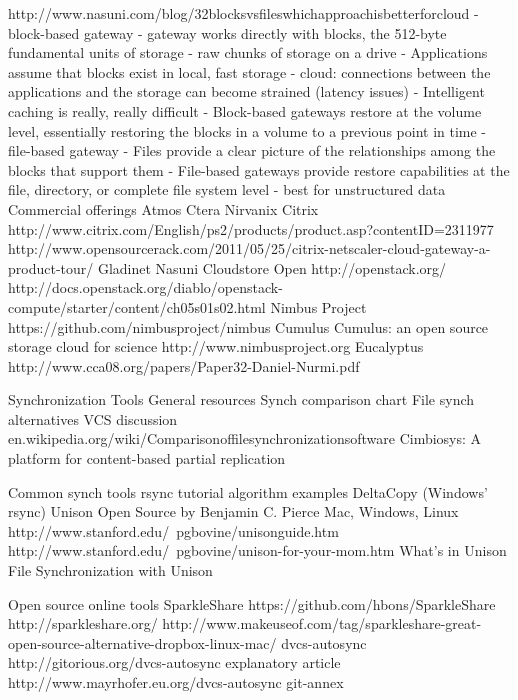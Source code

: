 			http://www.nasuni.com/blog/32blocksvsfileswhichapproachisbetterforcloud
				- block-based gateway
					- gateway works directly with blocks, the 512-byte fundamental units of storage
					- raw chunks of storage on a drive
					- Applications assume that blocks exist in local, fast storage
						- cloud: connections between the applications and the storage can become strained (latency issues)
					- Intelligent caching is really, really difficult 
					- Block-based gateways restore at the volume level, essentially restoring the blocks in a volume to a previous point in time
				- file-based gateway
					- Files provide a clear picture of the relationships among the blocks that support them
					- File-based gateways provide restore capabilities at the file, directory, or complete file system level
					- best for unstructured data
		Commercial offerings
			Atmos 
			Ctera
			Nirvanix 
			Citrix
			http://www.citrix.com/English/ps2/products/product.asp?contentID=2311977
			http://www.opensourcerack.com/2011/05/25/citrix-netscaler-cloud-gateway-a-product-tour/
			Gladinet 
			Nasuni
			Cloudstore 
		Open
			http://openstack.org/
				http://docs.openstack.org/diablo/openstack-compute/starter/content/ch05s01s02.html 
			Nimbus Project
				https://github.com/nimbusproject/nimbus
			Cumulus
				Cumulus: an open source storage cloud for science
				http://www.nimbusproject.org	
			Eucalyptus
				http://www.cca08.org/papers/Paper32-Daniel-Nurmi.pdf		

	Synchronization Tools
		General resources
			Synch comparison chart 
			File synch alternatives 
			VCS discussion
			en.wikipedia.org/wiki/Comparisonoffilesynchronizationsoftware
			Cimbiosys: A platform for content-based partial replication
		
		Common synch tools
			rsync
				tutorial
				algorithm 
				examples
			DeltaCopy (Windows' rsync)		
			Unison
				Open Source by Benjamin C. Pierce 
				Mac, Windows, Linux
				http://www.stanford.edu/~pgbovine/unisonguide.htm
				http://www.stanford.edu/~pgbovine/unison-for-your-mom.htm
				What's in Unison
				File Synchronization with Unison
				
		Open source online tools
			SparkleShare 
				https://github.com/hbons/SparkleShare
				http://sparkleshare.org/
				http://www.makeuseof.com/tag/sparkleshare-great-open-source-alternative-dropbox-linux-mac/
			dvcs-autosync
				http://gitorious.org/dvcs-autosync
				explanatory article
				http://www.mayrhofer.eu.org/dvcs-autosync
			git-annex
		
